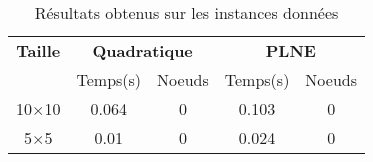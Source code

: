 \documentclass[main.tex]{subfiles}
\begin{document}
\thispagestyle{empty}

\begin{table}[h]
    \centering
    \begin{tabular}{ccccc}
	\hline	
	\textbf{Taille} &\multicolumn{2}{c}{\textbf{Quadratique}} &\multicolumn{2}{c}{\textbf{PLNE}}\\
	 &Temps(s) &Noeuds &Temps(s) &Noeuds\\

\hline
	10$\times$10 &0.064 &0 &0.103 &0\\
	5$\times$5 &0.01 &0 &0.024 &0\\
\end{tabular}\caption{Résultats obtenus sur les instances données}
\end{table}
\end{document}
